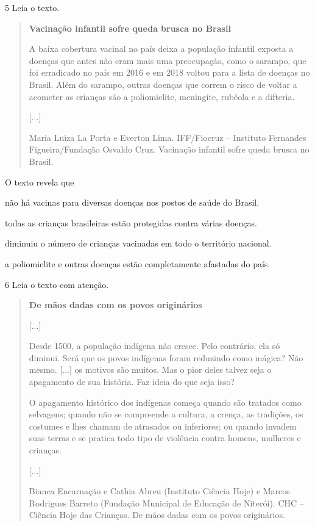 \num{5} Leia o texto.

\begin{quote}
\textbf{Vacinação infantil sofre queda brusca no Brasil}

A baixa cobertura vacinal no país deixa a população infantil exposta a
doenças que antes não eram mais uma preocupação, como o sarampo, que foi
erradicado no país em 2016 e em 2018 voltou para a lista de doenças no
Brasil. Além do sarampo, outras doenças que correm o risco de voltar a
acometer as crianças são a poliomielite, meningite, rubéola e a
difteria.

{[}...{]}

Maria Luiza La Porta e Everton Lima. IFF/Fiocruz -- Instituto Fernandes
Figueira/Fundação Osvaldo Cruz. Vacinação infantil sofre queda brusca no
Brasil. 
\end{quote}

O texto revela que

\begin{escolha}
\item não há vacinas para diversas doenças nos postos de saúde do Brasil.

\item todas as crianças brasileiras estão protegidas contra várias doenças.

\item diminuiu o número de crianças vacinadas em todo o território nacional.

\item a poliomielite e outras doenças estão completamente afastadas do país.
\end{escolha}


\num{6} Leia o texto com atenção.

\begin{quote}
\textbf{De mãos dadas com os povos originários}

{[}...{]}

Desde 1500, a população indígena não cresce. Pelo contrário, ela só
diminui. Será que os povos indígenas foram reduzindo como mágica? Não
mesmo. {[}...{]} os motivos são muitos. Mas o pior deles talvez seja o
apagamento de sua história. Faz ideia do que seja isso?

O apagamento histórico dos indígenas começa quando são tratados como
selvagens; quando não se compreende a cultura, a crença, as tradições,
os costumes e lhes chamam de atrasados ou inferiores; ou quando invadem
suas terras e se pratica todo tipo de violência contra homens, mulheres
e crianças.

{[}...{]}

Bianca Encarnação e Cathia Abreu (Instituto Ciência Hoje) e Marcos
Rodrigues Barreto (Fundação Municipal de Educação de Niterói). CHC --
Ciência Hoje das Crianças. De mãos dadas com os povos originários.
\end{quote}

